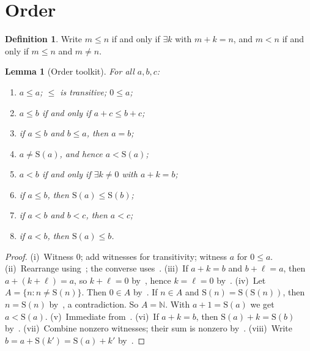 \documentclass[11pt,reqno]{amsart}
\theoremstyle{plain}
\newtheorem{lemma}[theorem]{Lemma}
\theoremstyle{definition}
\newtheorem{definition}[theorem]{Definition}
\theoremstyle{remark}
\newcommand{\N}{\mathbb{N}}
\newcommand{\Suc}{\mathrm{S}}
\numberwithin{equation}{section}
\begin{document}
\section{Order}
\label{sec:order}

\begin{definition}
\label{def:order}
Write \(m\le n\) if and only if \(\exists k\) with \(m+k=n\), and
\(m<n\) if and only if \(m\le n\) and \(m\neq n\).
\end{definition}

\begin{lemma}[Order toolkit]
\label{lem:order}
For all \(a,b,c\):
\begin{enumerate}[label=(\roman*)]
  \item \(a\le a\); \(\le\) is transitive; \(0\le a\);
  \item \(a\le b\) if and only if \(a+c\le b+c\);
  \item if \(a\le b\) and \(b\le a\), then \(a=b\);
  \item \(a\neq\Suc(a)\), and hence \(a<\Suc(a)\);
  \item \(a<b\) if and only if \(\exists k\neq 0\) with \(a+k=b\);
  \item if \(a\le b\), then \(\Suc(a)\le\Suc(b)\);
  \item if \(a<b\) and \(b<c\), then \(a<c\);
  \item if \(a<b\), then \(\Suc(a)\le b\).
\end{enumerate}
\end{lemma}

\begin{proof}
(i)~Witness \(0\); add witnesses for transitivity; witness \(a\) for
\(0\le a\).
(ii)~Rearrange using~; the converse
uses~.
(iii)~If \(a+k=b\) and \(b+\ell=a\), then \(a+(k+\ell)=a\), so
\(k+\ell=0\) by~, hence \(k=\ell=0\)
by~.
(iv)~Let \(A=\{n:n\neq\Suc(n)\}\). Then \(0\in A\)
by~. If \(n\in A\) and \(\Suc(n)=\Suc(\Suc(n))\), then
\(n=\Suc(n)\) by~, a contradiction. So \(A=\N\). With
\(a+1=\Suc(a)\) we get \(a<\Suc(a)\).
(v)~Immediate from~.
(vi)~If \(a+k=b\), then \(\Suc(a)+k=\Suc(b)\)
by~.
(vii)~Combine nonzero witnesses; their sum is nonzero
by~.
(viii)~Write \(b=a+\Suc(k')=\Suc(a)+k'\)
by~.
\end{proof}
\end{document}
